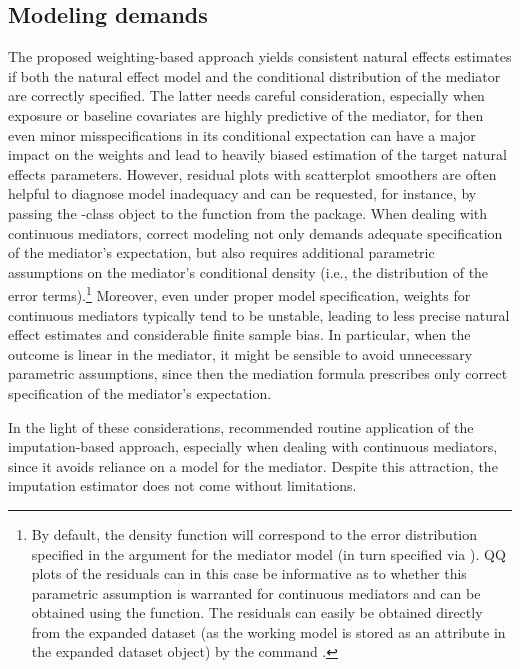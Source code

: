 \documentclass[nojss]{jss}
\begin{document}
\subsection{Modeling demands}
The proposed weighting-based approach yields consistent natural effects estimates if both the natural effect model and the conditional distribution of the mediator are correctly specified. The latter needs careful consideration, especially when exposure or baseline covariates are highly predictive of the mediator, for then even minor misspecifications in its conditional expectation can have a major impact on the weights and lead to heavily biased estimation of the target natural effects parameters. However, residual plots with scatterplot smoothers are often helpful to diagnose model inadequacy and can be requested, for instance, by passing the -class object to the  function from the  package. When dealing with continuous mediators, correct modeling not only demands adequate specification of the mediator's expectation, but also requires additional parametric assumptions on the mediator's conditional density (i.e., the distribution of the error terms).\footnote{By default, the density function will correspond to the error distribution specified in the  argument for the mediator model (in turn specified via ). QQ plots of the residuals can in this case be informative as to whether this parametric assumption is warranted for continuous mediators and can be obtained using the  function. The residuals can easily be obtained directly from the expanded dataset (as the working model is stored as an attribute in the expanded dataset object) by the command .} Moreover, even under proper model specification, weights for continuous mediators typically tend to be unstable, leading to less precise natural effect estimates and considerable finite sample bias. In particular, when the outcome is linear in the mediator, it might be sensible to avoid unnecessary parametric assumptions, since then the mediation formula prescribes only correct specification of the mediator's expectation.
\par In the light of these considerations, \cite{Vansteelandt2012} recommended routine application of the imputation-based approach, especially when dealing with continuous mediators, since it avoids reliance on a model for the mediator. Despite this attraction, the imputation estimator does not come without limitations.
\end{document}
